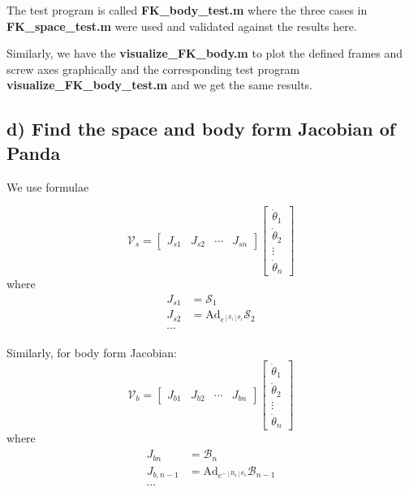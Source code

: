 \documentclass[english,10pt,a4paper]{article}
\begin{document}
    The test program is called \textbf{FK\_body\_test.m} where the three cases in \textbf{FK\_space\_test.m} were used and validated against the results here.
    
    Similarly, we have the \textbf{visualize\_FK\_body.m} to plot the defined frames and screw axes graphically and the corresponding test program \textbf{visualize\_FK\_body\_test.m} and we get the same results.
    
    \subsection*{d) Find the space and body form Jacobian of Panda}
    We use formulae

    $$\mathcal{V}_s = \begin{bmatrix}
    J_{s1} & J_{s2} & \cdots & J_{sn} 
\end{bmatrix}  \begin{bmatrix}
\dot{\theta}_1 \\ \dot{\theta}_2 \\ \vdots \\ \dot{\theta}_n
\end{bmatrix}$$
    where 
\begin{align*}
    J_{s1} &= \mathcal{S}_1 \\
    J_{s2} &= \text{Ad}_{e^{[S_1]\theta_1}} \mathcal{S}_2 \\
    \cdots
\end{align*}

    Similarly, for body form Jacobian:
$$\mathcal{V}_b = \begin{bmatrix}
    J_{b1} & J_{b2} & \cdots & J_{bn} 
\end{bmatrix}  \begin{bmatrix}
    \dot{\theta}_1 \\ \dot{\theta}_2 \\ \vdots \\ \dot{\theta}_n
\end{bmatrix}$$
    where 
\begin{align*}
    J_{bn} &= \mathcal{B}_n \\
    J_{b,{n-1}} &= \text{Ad}_{e^{-[B_n]\theta_n}} \mathcal{B}_{n-1} \\
    \cdots
\end{align*}
	
\end{document}
